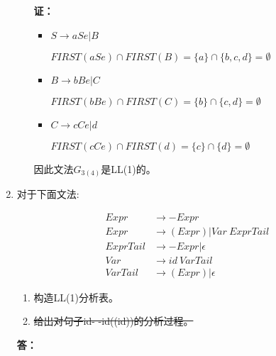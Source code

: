 \begin{enumerate}[1.]
\begin{enumerate}[(1)]
            \textbf{证：}
            
            \begin{itemize}
                \item $S \to aSe | B$
                
                $FIRST(aSe) \cap FIRST(B) = \{a\} \cap \{b, c, d\} = \emptyset$
                
                \item $B \to bBe | C$
                
                $FIRST(bBe) \cap FIRST(C) = \{b\} \cap \{c, d\} = \emptyset$
                
                \item $C \to cCe | d$
                
                $FIRST(cCe) \cap FIRST(d) = \{c\} \cap \{d\} = \emptyset$
            \end{itemize}
            
            因此文法$G_{3(4)}$是LL(1)的。
        \end{enumerate}
        
        
    
    \item 对于下面文法:
    
        \begin{align*}
            Expr & \to - Expr \\
            Expr & \to (Expr) | Var \ ExprTail \\
            ExprTail & \to - Expr | \epsilon \\
            Var & \to id \ VarTail \\
            VarTail & \to (Expr) | \epsilon
        \end{align*}
        
        \begin{enumerate}[(1)]
            \item 构造LL(1)分析表。
            \item \sout{给出对句子id- -id((id))的分析过程。}
        \end{enumerate}
        
        \textbf{答：}
        
        \begin{enumerate}[(1)]
        

\end{enumerate}
\end{enumerate}
